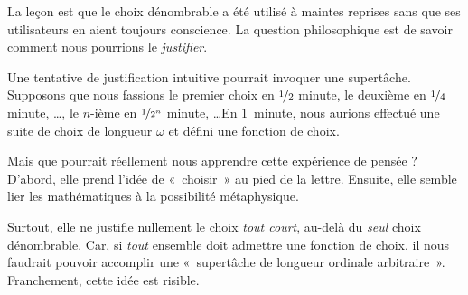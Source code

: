 \documentclass[../../../include/open-logic-section]{subfiles}
\begin{document}
La leçon est que le choix dénombrable
a été utilisé à maintes reprises
sans que ses utilisateurs en aient
toujours conscience. La question
philosophique est de savoir comment
nous pourrions le \emph{justifier}.

Une tentative de justification
intuitive pourrait invoquer une
supertâche. Supposons que nous
fassions le premier choix en
$\nicefrac{1}{2}$ minute,
le deuxième en $\nicefrac{1}{4}$
minute, \dots, le $n$-ième en
$\nicefrac{1}{2^n}$ minute,
\dots\@ En $1$~minute, nous aurions
effectué une suite de choix de
longueur $\omega$ et défini une
fonction de choix.

Mais que pourrait réellement nous
apprendre cette expérience de pensée ?
D'abord, elle prend l'idée de
«~choisir~» au pied de la lettre.
Ensuite, elle semble lier les
mathématiques à la possibilité
métaphysique.

Surtout, elle ne justifie nullement
le choix \emph{tout court}, au-delà
du \emph{seul} choix dénombrable.
Car, si \emph{tout} ensemble doit
admettre une fonction de choix,
il nous faudrait pouvoir accomplir
une «~supertâche de longueur ordinale
arbitraire~». Franchement, cette
idée est risible.
\end{document}
